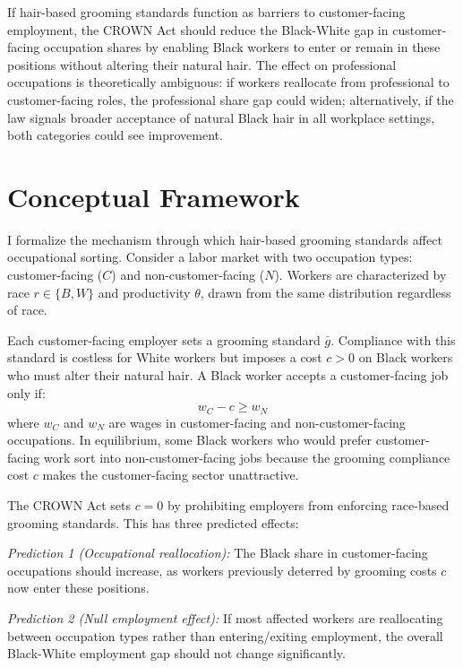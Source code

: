 \documentclass[12pt]{article}
\begin{document}
If hair-based grooming standards function as barriers to customer-facing employment, the CROWN Act should reduce the Black-White gap in customer-facing occupation shares by enabling Black workers to enter or remain in these positions without altering their natural hair. The effect on professional occupations is theoretically ambiguous: if workers reallocate from professional to customer-facing roles, the professional share gap could widen; alternatively, if the law signals broader acceptance of natural Black hair in all workplace settings, both categories could see improvement.

\section{Conceptual Framework}\label{sec:framework}

I formalize the mechanism through which hair-based grooming standards affect occupational sorting. Consider a labor market with two occupation types: customer-facing ($C$) and non-customer-facing ($N$). Workers are characterized by race $r \in \{B, W\}$ and productivity $\theta$, drawn from the same distribution regardless of race.

Each customer-facing employer sets a grooming standard $\bar{g}$. Compliance with this standard is costless for White workers but imposes a cost $c > 0$ on Black workers who must alter their natural hair. A Black worker accepts a customer-facing job only if:
\begin{equation}
w_C - c \geq w_N
\end{equation}
where $w_C$ and $w_N$ are wages in customer-facing and non-customer-facing occupations. In equilibrium, some Black workers who would prefer customer-facing work sort into non-customer-facing jobs because the grooming compliance cost $c$ makes the customer-facing sector unattractive.

The CROWN Act sets $c = 0$ by prohibiting employers from enforcing race-based grooming standards. This has three predicted effects:

\textit{Prediction 1 (Occupational reallocation):} The Black share in customer-facing occupations should increase, as workers previously deterred by grooming costs $c$ now enter these positions.

\textit{Prediction 2 (Null employment effect):} If most affected workers are reallocating between occupation types rather than entering/exiting employment, the overall Black-White employment gap should not change significantly.
\end{document}

